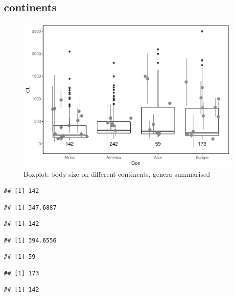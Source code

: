 \documentclass[]{article}
\begin{document}
\newpage

\subsection{continents}\label{continents-1}

\begin{figure}[htbp]
\centering
\includegraphics{MA_JJ_files/figure-latex/BPCon-1.pdf}
\caption{Boxplot: body size on different continents, genera summarised}
\end{figure}

\begin{verbatim}
## [1] 142
\end{verbatim}

\begin{verbatim}
## [1] 347.6887
\end{verbatim}

\begin{verbatim}
## [1] 142
\end{verbatim}

\begin{verbatim}
## [1] 394.6556
\end{verbatim}

\begin{verbatim}
## [1] 59
\end{verbatim}

\begin{verbatim}
## [1] 173
\end{verbatim}

\begin{verbatim}
## [1] 142
\end{verbatim}
\end{document}
